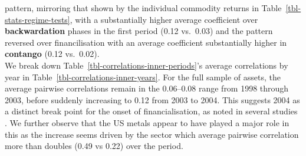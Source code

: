 \documentclass[
  authoryear,
  preprint,
  3p]{elsarticle}
\begin{document}
pattern, mirroring that shown by the individual commodity returns in
Table~\ref{tbl-stats-regime-tests}, with a substantially higher average
coefficient over \textbf{backwardation} phases in the first period (0.12
vs.~0.03) and the pattern reversed over financilisation with an average
coefficient substantially higher in \textbf{contango} (0.12 vs.~0.02).\\
We break down Table~\ref{tbl-correlations-inner-periods}'s average
correlations by year in Table~\ref{tbl-correlations-inner-years}. For
the full sample of assets, the average pairwise correlations remain in
the 0.06--0.08 range from 1998 through 2003, before suddenly increasing
to 0.12 from 2003 to 2004. This suggests 2004 as a distinct break point
for the onset of financialisation, as noted in several studies
\citep{baker_financialization_2021, tang_index_2012}. We further observe
that the US metals appear to have played a major role in this as the
increase seems driven by the sector which average pairwise correlation
more than doubles (0.49 vs 0.22) over the period.

\medskip
\end{document}
